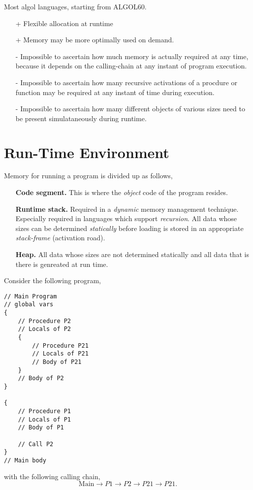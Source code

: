 \documentclass[a4paper]{scrartcl}
\theoremstyle{definition}
\begin{document}
Most algol languages, starting from ALGOL60.

\begin{itemize}
	\item[+] Flexible allocation at runtime
	\item[+] Memory may be more optimally used on demand.
	\item[-] Impossible to ascertain how much memory is actually required at any time, because it depends on the calling-chain at any instant of program execution.
	\item[-] Impossible to ascertain how many recursive activations of a procdure or function may be required at any instant of time during execution.
	\item[-] Impossible to ascertain how many different objects of various sizes need to be present simulataneously during runtime.
\end{itemize}

\section{Run-Time Environment}
Memory for running a program is divided up as follows,

\begin{itemize}
	\item[\textbf{Code segment.}] This is where the \emph{object} code of the program resides.
	\item[\textbf{Runtime stack.}] Required in a \emph{dynamic} memory management technique. Especially required in languages which support \emph{recursion}.
		All data whose sizes can be determined \emph{statically} before loading is stored in an appropriate \emph{stack-frame} (activation road).
	\item[\textbf{Heap.}] All data whose sizes are not determined statically and all data that is there is genreated at run time.
\end{itemize}

Consider the following program,
\begin{verbatim}
// Main Program
// global vars
{
	// Procedure P2
	// Locals of P2
	{
		// Procedure P21
		// Locals of P21
		// Body of P21
	}
	// Body of P2
}

{
	// Procedure P1
	// Locals of P1
	// Body of P1
	
	// Call P2
}
// Main body
\end{verbatim}
with the following calling chain,
\[\text{Main} \to P1 \to P2 \to P21 \to P21.\]
\end{document}
